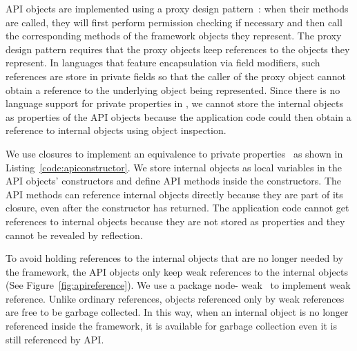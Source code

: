 API objects are implemented using a proxy design pattern~\cite{gamma1994design}:  
when their methods are
called, they will first perform permission checking if necessary and then call
the corresponding methods of the framework objects they represent. The proxy
design pattern requires that the proxy objects keep references to the objects they
represent. In languages that feature encapsulation via field modifiers, such 
references are store in private fields so
that the caller of the proxy object cannot obtain a reference to the 
underlying object being represented. Since there is no language support for private
properties in \js, we cannot  store the internal objects as properties of the
API objects because the application code could then obtain a reference to internal
objects using object inspection. 


We use closures to implement an equivalence to private properties~\cite{jsprivate} as
shown in Listing~\ref{code:apiconstructor}. We store internal objects as local
variables in the API objects' constructors and define API methods inside the
constructors. The API methods can reference internal objects
directly because they are part of its closure, even after the constructor has returned.
The application code cannot get references to internal objects because they 
are not stored as properties and they cannot be revealed by reflection.


To avoid holding references to the internal objects that are no longer needed
by the framework, the API objects only keep weak references to the internal
objects (See Figure~\ref{fig:apireference}). We use a \nodejs{} package node-
weak~\cite{nodeweak} to implement weak reference. Unlike ordinary references,
objects referenced only by weak references are free to be garbage
collected.
In this way, when an internal object is no longer referenced
inside the framework, it is available for garbage collection even 
it is still referenced by API.

